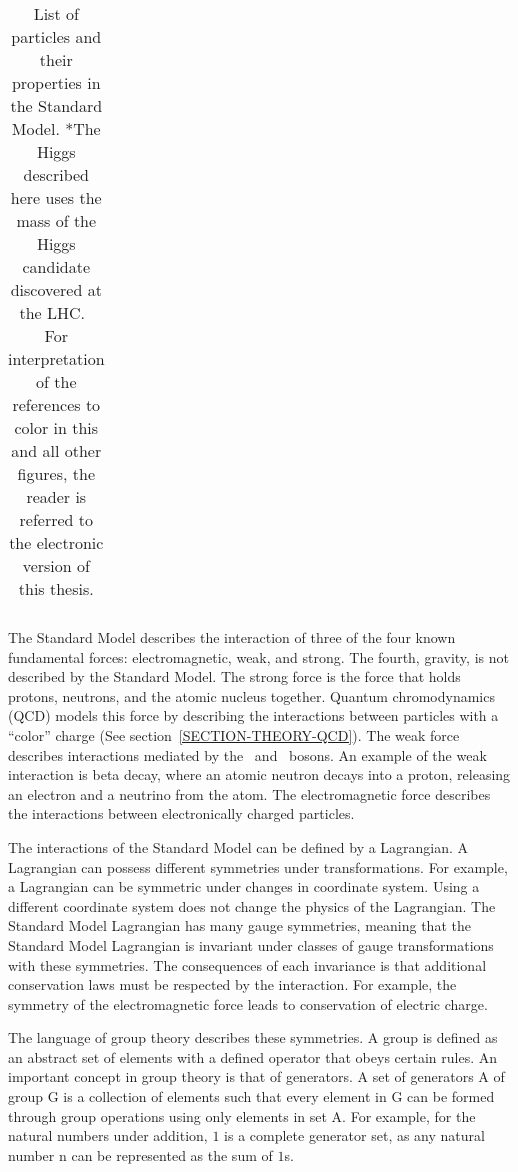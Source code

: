 \begin{table}[!h!tbp]
\begin{center}
\begin{tabular}{|l|l|c|c|c|c|}
\hline
\end{tabular}
\caption{List of particles and their properties in the Standard Model. *The Higgs described here uses the mass of the Higgs candidate discovered at the LHC.~\cite{HiggsATLAS,HiggsCMS} For interpretation of the references to color in this and all other figures, the reader is referred to the electronic version of this thesis.}
\label{TABLE-THEORY-STANDARDMODEL}
\end{center}
\end{table}

The Standard Model describes the interaction of three of the four known fundamental forces: electromagnetic, weak, and strong. The fourth, gravity, is not described by the Standard Model. The strong force is the force that holds protons, neutrons, and the atomic nucleus together. Quantum chromodynamics (QCD) models this force by describing the interactions between particles with a ``color'' charge (See section~\ref{SECTION-THEORY-QCD}). The weak force describes interactions mediated by the \Wboson\ and \Zboson\ bosons. An example of the weak interaction is beta decay, where an atomic neutron decays into a proton, releasing an electron and a neutrino from the atom. The electromagnetic force describes the interactions between electronically charged particles. 

The interactions of the Standard Model can be defined by a Lagrangian. A Lagrangian can possess different symmetries under transformations.  For example, a Lagrangian can be symmetric under changes in coordinate system. Using a different coordinate system does not change the physics of the Lagrangian. The Standard Model Lagrangian has many gauge symmetries, meaning that the Standard Model Lagrangian is invariant under classes of gauge transformations with these symmetries. The consequences of each invariance is that additional conservation laws must be respected by the interaction. For example, the symmetry of the electromagnetic force leads to conservation of electric charge. 

The language of group theory describes these symmetries. A group is defined as an abstract set of elements with a defined operator that obeys certain rules. An important concept in group theory is that of generators. A set of generators A of group G is a collection of elements such that every element in G can be formed through group operations using only elements in set A. For example, for the natural numbers under addition, ${1}$ is a complete generator set, as any natural number n can be represented as the sum of $1$s. 

